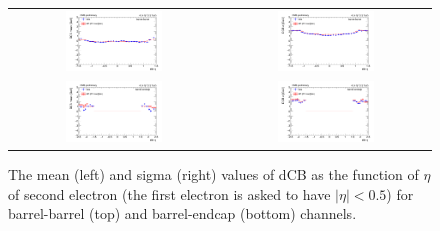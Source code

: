\begin{figure}[ht]
  \begin{center}
    \begin{tabular}{cc}
      \includegraphics[width=0.48\textwidth]{figures/Zprime/2017/mass_resolution/scale_check/h_float_eta_Mee_BB_scale} &
      \includegraphics[width=0.48\textwidth]{figures/Zprime/2017/mass_resolution/scale_check/h_float_eta_Mee_BB_resolution} \\
      \includegraphics[width=0.48\textwidth]{figures/Zprime/2017/mass_resolution/scale_check/h_endcap_eta_Mee_BE_scale} &
      \includegraphics[width=0.48\textwidth]{figures/Zprime/2017/mass_resolution/scale_check/h_endcap_eta_Mee_BE_resolution}
    \end{tabular}
    \caption{The mean (left) and sigma (right) values of dCB as the function of $\eta$ of second electron (the first electron is asked to have $|\eta|<0.5$) for barrel-barrel (top) and barrel-endcap (bottom) channels.
    \label{fig:data_MC_eta_BB_BE}}
  \end{center}
\end{figure}






